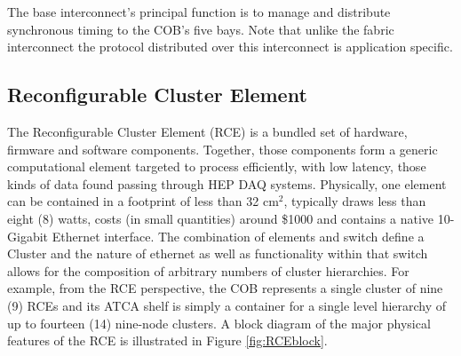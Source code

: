 The base interconnect's principal function is to manage 
and distribute synchronous timing to the COB's five bays.
Note that unlike the fabric interconnect the protocol 
distributed over this interconnect is application specific. 


\subsection{Reconfigurable Cluster Element}
\label{sec:RCE}
The Reconfigurable Cluster Element (RCE) is a bundled set of hardware, 
firmware and software components. 
Together, those components form a generic computational element 
targeted to process efficiently, with low latency, those
kinds of data found passing through HEP DAQ systems. 
Physically, one element can be contained in a footprint of less than 32 cm$^2$, 
typically draws less than eight (8) watts, costs (in small quantities) 
around \$1000 and contains a native 10-Gigabit Ethernet interface. 
The combination of elements and switch define a Cluster and 
the nature of ethernet as well as functionality within that switch 
allows for the composition of arbitrary numbers of cluster hierarchies. 
For example, from the RCE perspective, the COB represents a single cluster 
of nine (9) RCEs and its ATCA shelf is simply a container for a 
single level hierarchy of up to fourteen (14) nine-node clusters. 
A block diagram of the major physical features of the RCE is illustrated in Figure 
\ref{fig:RCEblock}.

